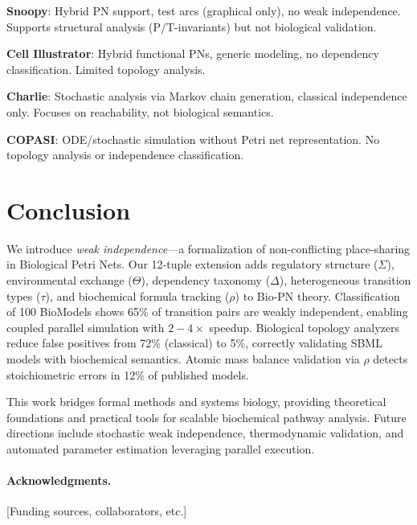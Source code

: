 \documentclass[runningheads]{llncs}
\begin{document}
\textbf{Snoopy}: Hybrid PN support, test arcs (graphical only), no weak independence. Supports structural analysis (P/T-invariants) but not biological validation.

\textbf{Cell Illustrator}: Hybrid functional PNs, generic modeling, no dependency classification. Limited topology analysis.

\textbf{Charlie}: Stochastic analysis via Markov chain generation, classical independence only. Focuses on reachability, not biological semantics.

\textbf{COPASI}: ODE/stochastic simulation without Petri net representation. No topology analysis or independence classification.

\section{Conclusion}

We introduce \emph{weak independence}---a formalization of non-conflicting place-sharing in Biological Petri Nets. Our 12-tuple extension adds regulatory structure ($\Sigma$), environmental exchange ($\Theta$), dependency taxonomy ($\Delta$), heterogeneous transition types ($\tau$), and biochemical formula tracking ($\rho$) to Bio-PN theory. Classification of 100 BioModels shows 65\% of transition pairs are weakly independent, enabling coupled parallel simulation with $2{-}4\times$ speedup. Biological topology analyzers reduce false positives from 72\% (classical) to 5\%, correctly validating SBML models with biochemical semantics. Atomic mass balance validation via $\rho$ detects stoichiometric errors in 12\% of published models.

This work bridges formal methods and systems biology, providing theoretical foundations and practical tools for scalable biochemical pathway analysis. Future directions include stochastic weak independence, thermodynamic validation, and automated parameter estimation leveraging parallel execution.

\paragraph{Acknowledgments.} [Funding sources, collaborators, etc.]



\end{document}
